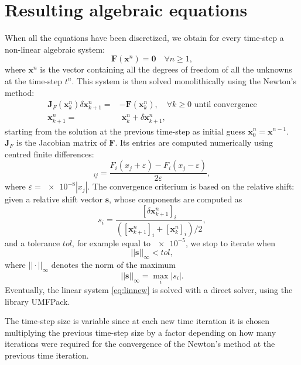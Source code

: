 \section{Resulting algebraic equations} \label{sec:algeq}
When all the equations have been discretized, we obtain for every 
time-step a non-linear algebraic system:
\begin{equation}
	\mathbf{F}(\mathbf{x}^n) = \mathbf{0} \quad \forall n\geq 1,
\end{equation}
where $\mathbf{x}^n$ is the vector containing all the degrees of freedom of all the unknowns at the time-step $t^n$. This system is then solved monolithically using the Newton's method:
\begin{align}
\label{eq:linnew}\mathbf{J}_F(\mathbf{x}^n_k) \delta \mathbf{x}^n_{k+1} = &-\mathbf{F}(\mathbf{x}_k^n), \quad \text{$\forall k\geq 0$ until 
	convergence}\\
\mathbf{x}^n_{k+1} = &\;\mathbf{x}^n_k + \delta \mathbf{x}^n_{k+1},
\end{align}
starting from the solution at the previous time-step as initial guess $\mathbf{x}_0^n = \mathbf{x}^{n-1}$.
$\mathbf{J}_F$ is the Jacobian matrix of $\mathbf{F}$. Its entries are computed numerically using centred finite differences:
\begin{equation}
[\mathbf{J}_F]_{ij} = \frac{F_i(x_j + \varepsilon) - F_i(x_j - \varepsilon)}{2\varepsilon},
\end{equation}
where $\varepsilon=\num{e-8}|x_j|$. The convergence criterium is based on the relative shift: given a relative shift vector $\mathbf{s}$, whose components are computed as
\begin{equation}
	s_i = \frac{[\delta \mathbf{x}^n_{k+1}]_i}{([\mathbf{x}^n_{k+1}]_i + [\mathbf{x}^n_{k}]_i) / 2},
\end{equation}
and a tolerance $tol$, for example equal to $\num{e-5}$, we stop to iterate when
\begin{equation}
	|\!|\mathbf{s}|\!|_\infty < tol,
\end{equation}
where $|\!| \cdot |\!|_	\infty$ denotes the norm of the maximum
\begin{equation}
	|\!|\mathbf{s}|\!|_\infty = \max_i |s_i|.
\end{equation}
Eventually, the linear system \eqref{eq:linnew} is solved with a direct solver, using the library UMFPack.

The time-step size is variable since at each new time iteration it is chosen 
multiplying the previous time-step size by a factor depending on how many iterations were required for the 
convergence of the Newton's method at the previous time iteration.